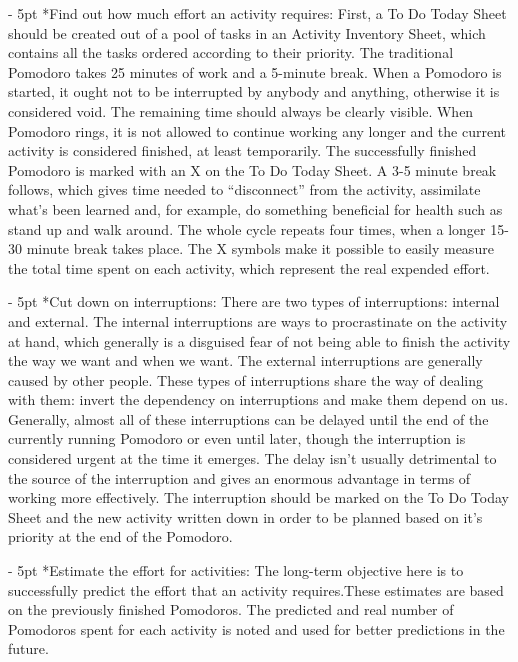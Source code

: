 \documentclass[11pt,singleside]{myfithesis2}
\makeatletter
\renewcommand\paragraph{
   \vspace{-10pt}
   \@startsection{paragraph}{4}{0mm}
      {\baselineskip}
      {- 5pt}
      {\normalfont\normalsize\bfseries}
}
\makeatother
\begin{document}
\paragraph*{Find out how much effort an activity requires: } First, a To Do Today Sheet should be created out of a pool of tasks in an Activity Inventory Sheet, which contains all the tasks ordered according to their priority. The traditional Pomodoro takes 25 minutes of work and a 5-minute break. When a Pomodoro is started, it ought not to be interrupted by anybody and anything, otherwise it is considered void. The remaining time should always be clearly visible. When Pomodoro rings, it is not allowed to continue working any longer and the current activity is considered finished, at least temporarily. The successfully finished Pomodoro is marked with an X on the To Do Today Sheet. A 3-5 minute break follows, which gives time needed to ``disconnect'' from the activity, assimilate what's been learned and, for example, do something beneficial for health such as stand up and walk around. The whole cycle repeats four times, when a longer 15-30 minute break takes place. The X symbols make it possible to easily measure the total time spent on each activity, which represent the real expended effort.
\paragraph*{Cut down on interruptions: } There are two types of interruptions: internal and external. The internal interruptions are ways to procrastinate on the activity at hand, which generally is a disguised fear of not being able to finish the activity the way we want and when we want. The external interruptions are generally caused by other people. These types of interruptions share the way of dealing with them: invert the dependency on interruptions and make them depend on us. Generally, almost all of these interruptions can be delayed until the end of the currently running Pomodoro or even until later, though the interruption is considered urgent at the time it emerges. The delay isn't usually detrimental to the source of the interruption and gives an enormous advantage in terms of working more effectively. The interruption should be marked on the To Do Today Sheet and the new activity written down in order to be planned based on it's priority at the end of the Pomodoro.
\paragraph*{Estimate the effort for activities: } The long-term objective here is to successfully predict the effort that an activity requires.These estimates are based on the previously finished Pomodoros. The predicted and real number of Pomodoros spent for each activity is noted and used for better predictions in the future.
\end{document}
